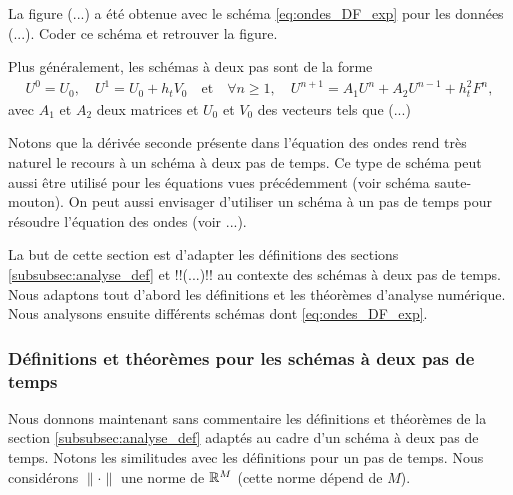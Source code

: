 \documentclass[12pt,a4paper,twoside]{article}
\begin{document}
\begin{exercise}
  La figure (...) a \'et\'e obtenue avec le sch\'ema \eqref{eq:ondes_DF_exp}
  pour les donn\'ees (...).
  Coder ce sch\'ema et retrouver la figure.
\end{exercise}


Plus g\'en\'eralement, les sch\'emas \`a deux pas sont de la forme
\begin{align}
  \label{eq:schema_2pas}
  U^0 = U_0 , \quad U^1 = U_0 + h_t V_0 \quad \text{et} 
  \quad \forall n \geq 1, \quad U^{n+1} = A_1 U^n + A_2 U^{n-1} + h_t^2 F^n ,
\end{align}
avec $A_1$ et $A_2$ deux matrices et $U_0$ et $V_0$ des vecteurs tels que (...)

\begin{remark}
  Notons que la d\'eriv\'ee seconde pr\'esente dans l'\'equation des ondes 
  rend tr\`es naturel le recours \`a un sch\'ema \`a deux pas de temps.
  Ce type de sch\'ema peut aussi \^etre utilis\'e pour les \'equations vues
  pr\'ec\'edemment (voir sch\'ema saute-mouton).
  On peut aussi envisager d'utiliser un sch\'ema \`a un pas de temps
  pour r\'esoudre l'\'equation des ondes (voir ...).
\end{remark}

La but de cette section est d'adapter les d\'efinitions des sections \ref{subsubsec:analyse_def}
et !!(...)!! au contexte des sch\'emas \`a deux pas de temps.
Nous adaptons tout d'abord les d\'efinitions et les th\'eor\`emes d'analyse num\'erique.
Nous analysons ensuite diff\'erents sch\'emas dont \eqref{eq:ondes_DF_exp}.
\subsubsection{D\'efinitions et th\'eor\`emes 
  pour les sch\'emas \`a deux pas de temps}

Nous donnons maintenant sans commentaire les d\'efinitions et th\'eor\`emes de la section
\ref{subsubsec:analyse_def} adapt\'es au cadre d'un sch\'ema \`a deux pas de temps.
Notons les similitudes avec les d\'efinitions pour un pas de temps.
Nous consid\'erons $\|\cdot\|$ une norme de $\mathbb{R}^M$ (cette norme d\'epend de $M$).
\end{document}
